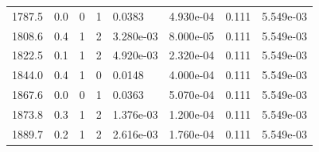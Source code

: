 \documentclass[preview]{standalone}
\begin{document}
{{{{\begin{tabular}{L{1.2cm}C{1.2cm} C{0.3cm}C{0.5cm} C{1.4cm}C{1.4cm} C{1.4cm}C{1.4cm}}
  1787.5  &   0.0  & 0     &  1 &  0.0383  & 4.930e-04  & 0.111 &  5.549e-03   \\ 
  1808.6  &   0.4  & 1     &  2 &  3.280e-03  & 8.000e-05  & 0.111 &  5.549e-03   \\ 
  1822.5  &   0.1  & 1     &  2 &  4.920e-03  & 2.320e-04  & 0.111 &  5.549e-03   \\ 
  1844.0  &   0.4  & 1     &  0 &  0.0148  & 4.000e-04  & 0.111 &  5.549e-03   \\ 
  1867.6  &   0.0  & 0     &  1 &  0.0363  & 5.070e-04  & 0.111 &  5.549e-03   \\ 
  1873.8  &   0.3  & 1     &  2 &  1.376e-03  & 1.200e-04  & 0.111 &  5.549e-03   \\ 
  1889.7  &   0.2  & 1     &  2 &  2.616e-03  & 1.760e-04  & 0.111 &  5.549e-03   \\ 
\hline 
\end{tabular} 

}}}}
\end{document}

